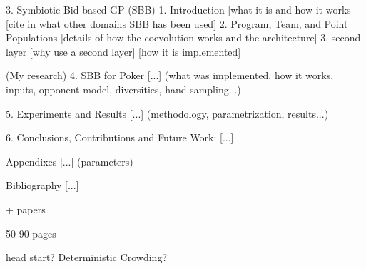 3. Symbiotic Bid-based GP (SBB)
    1. Introduction
        [what it is and how it works]
        [cite in what other domains SBB has been used]
    2. Program, Team, and Point Populations
        [details of how the coevolution works and the architecture]
    3. second layer
        [why use a second layer]
        [how it is implemented]

(My research)
4. SBB for Poker
[...] (what was implemented, how it works, inputs, opponent model, diversities, hand sampling...)

5. Experiments and Results
[...] (methodology, parametrization, results...)

6. Conclusions, Contributions and Future Work:
[...]

Appendixes
[...] (parameters)

Bibliography
[...]


+ papers

50-90 pages

head start?
Deterministic Crowding?
